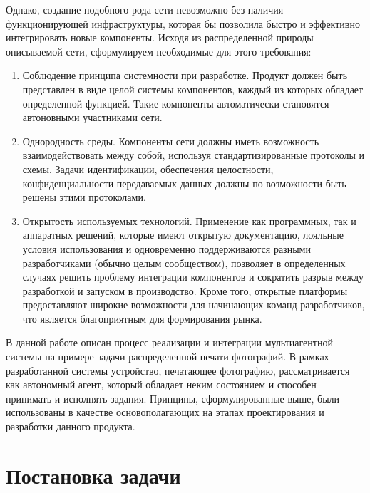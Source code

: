 \documentclass[a4paper,14pt,href]{article}
\begin{document}
Однако, создание подобного рода сети невозможно без наличия функционирующей инфраструктуры, которая бы позволила быстро и эффективно интегрировать новые компоненты. Исходя из распределенной природы описываемой сети, сформулируем необходимые для этого требования:

\begin{enumerate}
  \item Соблюдение принципа системности при разработке\cite{SystemPrinciple}. Продукт должен быть представлен в виде целой системы компонентов, каждый из которых обладает определенной функцией. Такие компоненты автоматически становятся автоновными участниками сети.

  \item Однородность среды. Компоненты сети должны иметь возможность взаимодействовать между собой, используя стандартизированные протоколы и схемы. Задачи идентификации, обеспечения целостности, конфиденциальности передаваемых данных должны по возможности быть решены этими протоколами.

  \item Открытость используемых технологий. Применение как программных, так и аппаратных решений, которые имеют открытую документацию, лояльные  условия использования и одновременно поддерживаются разными разработчиками (обычно целым сообществом), позволяет в определенных случаях решить проблему интеграции компонентов и сократить разрыв между разработкой и запуском в производство. Кроме того, открытые платформы предоставляют широкие возможности для начинающих команд разработчиков, что является благоприятным для формирования рынка.
\end{enumerate}

В данной работе описан процесс реализации и интеграции муль\-тиагентной системы на примере задачи распределенной печати фотографий. В рамках разработанной системы устройство, печатающее фотографию, рассматривается как автономный агент, который обладает неким состоянием и способен принимать и исполнять задания. Принципы, сформулированные выше, были использованы в качестве основополагающих на этапах проектирования и разработки данного продукта.

\section*{Постановка задачи}



\newpage
{}



\end{document}

